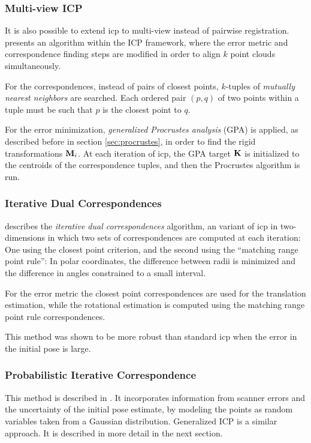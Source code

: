 \subsubsection{Multi-view ICP}
It is also possible to extend \gls{icp} to multi-view instead of pairwise registration. \cite{Told2010} presents an algorithm within the ICP framework, where the error metric and correspondence finding steps are modified in order to align $k$ point clouds simultaneously.

For the correspondences, instead of pairs of closest points, $k$-tuples of \emph{mutually nearest neighbors} are searched. Each ordered pair $(p, q)$ of two points within a tuple must be such that $p$ is the closest point to $q$. 

For the error minimization, \emph{generalized Procrustes analysis} (GPA) is applied, as described before in section \ref{sec:procrustes}, in order to find the rigid transformations $\mathbf{M}_i$. At each iteration of \gls{icp}, the GPA target $\mathbf{K}$ is initialized to the centroids of the correspondence tuples, and then the Procrustes algorithm is run.


\subsubsection{Iterative Dual Correspondences}
\cite{Lu1997} describes the \emph{iterative dual correspondences} algorithm, an variant of \gls{icp} in two-dimensions in which two sets of correspondences are computed at each iteration: One using the closest point criterion, and the second using the ``matching range point rule'': In polar coordinates, the difference between radii is minimized and the difference in angles constrained to a small interval.

For the error metric the closest point correspondences are used for the translation estimation, while the rotational estimation is computed using the matching range point rule correspondences.

This method was shown to be more robust than standard \gls{icp} when the error in the initial pose is large. \cite{Magn2013}


\subsubsection{Probabilistic Iterative Correspondence}
This method is described in \cite{Mont2005}. It incorporates information from scanner errors and the uncertainty of the initial pose estimate, by modeling the points as random variables taken from a Gaussian distribution. Generalized ICP is a similar approach. It is described in more detail in the next section.


